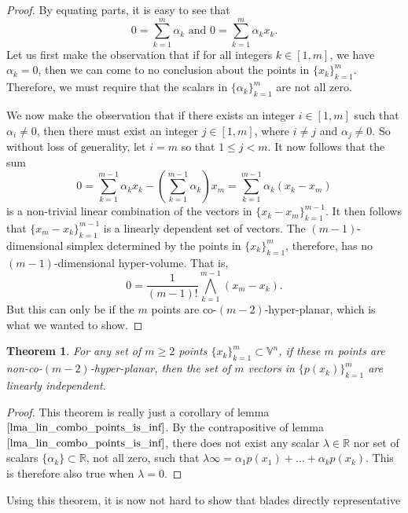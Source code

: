\documentclass[12pt]{article}
\newcommand{\V}{\mathbb{V}}
\newcommand{\R}{\mathbb{R}}
\newcommand{\nvai}{\infty}
\newtheorem{theorem}{Theorem}[section]
\begin{document}
\begin{proof}
By equating parts, it is easy to see that
\begin{equation*}
\mbox{$\displaystyle{0=\sum_{k=1}^m\alpha_k}$ and $\displaystyle{0=\sum_{k=1}^m\alpha_k x_k}$.}
\end{equation*}
Let us first make the observation that if for all integers $k\in[1,m]$, we have
$\alpha_k=0$, then we can come to no conclusion about the points in $\{x_k\}_{k=1}^m$.
Therefore, we must require that the scalars in $\{\alpha_k\}_{k=1}^m$ are not
all zero.

We now make the observation that if there exists an integer $i\in[1,m]$ such that
$\alpha_i\neq 0$, then there must exist an integer $j\in[1,m]$, where $i\neq j$ and
$\alpha_j\neq 0$.
So without loss of generality, let $i=m$ so that $1\leq j<m$.
It now follows that the sum
\begin{equation*}
0 = \sum_{k=1}^{m-1}\alpha_k x_k - \left(\sum_{k=1}^{m-1}\alpha_k\right)x_m
 = \sum_{k=1}^{m-1}\alpha_k(x_k-x_m)
\end{equation*}
is a non-trivial linear combination of the vectors in $\{x_k-x_m\}_{k=1}^{m-1}$.
It then follows that $\{x_m-x_k\}_{k=1}^{m-1}$ is a linearly dependent set of vectors.
The $(m-1)$-dimensional simplex determined by the points in $\{x_k\}_{k=1}^m$, therefore,
has no $(m-1)$-dimensional hyper-volume.  That is,
\begin{equation*}
0=\frac{1}{(m-1)!}\bigwedge_{k=1}^{m-1}(x_m-x_k).
\end{equation*}
But this can only be if the $m$ points are co-$(m-2)$-hyper-planar,
which is what we wanted to show.
\end{proof}
\begin{theorem}\label{thm_fit_round}
For any set of $m\geq 2$ points $\{x_k\}_{k=1}^m\subset\V^n$, if these
$m$ points are non-co-$(m-2)$-hyper-planar, then the set of $m$ vectors in $\{p(x_k)\}_{k=1}^m$
are linearly independent.
\end{theorem}
\begin{proof}
This theorem is really just a corollary of lemma $\eqref{lma_lin_combo_points_is_inf}$.
By the contrapositive of lemma $\eqref{lma_lin_combo_points_is_inf}$, there does not
exist any scalar $\lambda\in\R$ nor set of scalars $\{\alpha_k\}\subset\R$, not all zero, such
that $\lambda\nvai = \alpha_1 p(x_1)+\dots+\alpha_kp(x_k)$.  This is therefore also true when $\lambda=0$.
\end{proof}
Using this theorem, it is now not hard to show that blades directly representative
\end{document}
